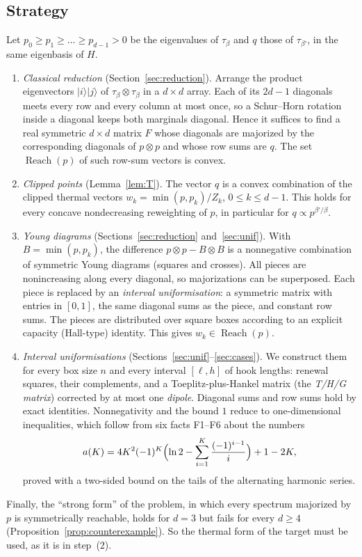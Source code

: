 \documentclass[11pt]{amsart}
\theoremstyle{definition}
\theoremstyle{remark}
\numberwithin{equation}{section}
\newcommand{\Reach}{\operatorname{Reach}}
\begin{document}
\subsection{Strategy}
Let $p_0\ge p_1\ge\dots\ge p_{d-1}>0$ be the eigenvalues of $\tau_\beta$ and $q$ those of
$\tau_{\beta'}$, in the same eigenbasis of $H$.
\begin{enumerate}
\item \emph{Classical reduction} (Section~\ref{sec:reduction}). Arrange the product eigenvectors
$|i\rangle|j\rangle$ of $\tau_\beta\otimes\tau_\beta$ in a $d\times d$ array. Each of its $2d-1$
diagonals meets every row and every column at most once, so a Schur--Horn rotation inside a diagonal
keeps both marginals diagonal. Hence it suffices to find a real symmetric $d\times d$ matrix $F$
whose diagonals are majorized by the corresponding diagonals of $p\otimes p$ and whose row sums are
$q$. The set $\Reach(p)$ of such row-sum vectors is convex.
\item \emph{Clipped points} (Lemma~\ref{lem:T}). The vector $q$ is a convex combination of the
clipped thermal vectors $w_k=\min(p,p_k)/Z_k$, $0\le k\le d-1$. This holds for every concave
nondecreasing reweighting of $p$, in particular for $q\propto p^{\beta'/\beta}$.
\item \emph{Young diagrams} (Sections~\ref{sec:reduction} and~\ref{sec:unif}). With
$B=\min(p,p_k)$, the difference $p\otimes p-B\otimes B$ is a nonnegative combination of symmetric Young
diagrams (squares and crosses). All pieces are nonincreasing along every diagonal, so majorizations
can be superposed. Each piece is replaced by an \emph{interval uniformisation}: a symmetric matrix
with entries in $[0,1]$, the same diagonal sums as the piece, and constant row sums. The pieces are
distributed over square boxes according to an explicit capacity (Hall-type) identity. This gives
$w_k\in\Reach(p)$.
\item \emph{Interval uniformisations} (Sections~\ref{sec:unif}--\ref{sec:cases}). We construct them
for every box size $n$ and every interval $[\ell,h]$ of hook lengths: renewal squares, their
complements, and a Toeplitz-plus-Hankel matrix (the \emph{T/H/G matrix}) corrected by at most one
\emph{dipole}. Diagonal sums and row sums hold by exact identities. Nonnegativity and the bound $1$
reduce to one-dimensional inequalities, which follow from six facts F1--F6 about the numbers
\[
  a(K)=4K^2(-1)^K\Bigl(\ln 2-\sum_{i=1}^{K}\frac{(-1)^{i-1}}{i}\Bigr)+1-2K ,
\]
proved with a two-sided bound on the tails of the alternating harmonic series.
\end{enumerate}
Finally, the ``strong form'' of the problem, in which every spectrum majorized by $p$ is
symmetrically reachable, holds for $d=3$ \cite[Thm.~1]{BakhshinezhadEtAl2019} but fails for every
$d\ge4$ (Proposition~\ref{prop:counterexample}). So the thermal form of the target must be used, as it
is in step~(2).
\end{document}
